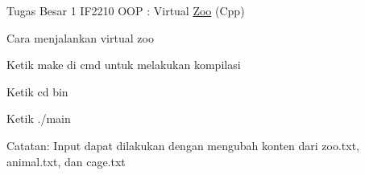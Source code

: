 Tugas Besar 1 I\+F2210 O\+OP \+: Virtual \hyperlink{classZoo}{Zoo} (Cpp)

Cara menjalankan virtual zoo
\begin{DoxyEnumerate}
\item Ketik make di cmd untuk melakukan kompilasi
\item Ketik cd bin
\item Ketik ./main
\end{DoxyEnumerate}

Catatan\+: Input dapat dilakukan dengan mengubah konten dari zoo.\+txt, animal.\+txt, dan cage.\+txt 
